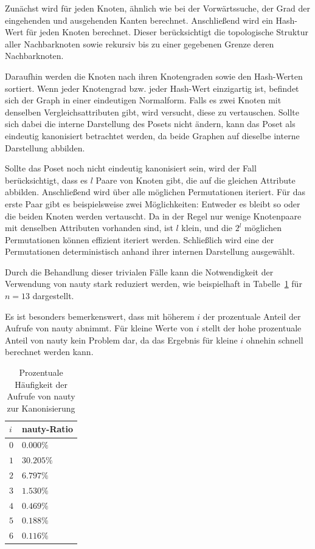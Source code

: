 \documentclass[10pt,journal,compsoc]{IEEEtran}
\begin{document}
Zunächst wird für jeden Knoten, ähnlich wie bei der Vorwärtssuche, der Grad der eingehenden und ausgehenden Kanten berechnet.
Anschließend wird ein Hash-Wert für jeden Knoten berechnet.
Dieser berücksichtigt die topologische Struktur aller Nachbarknoten sowie rekursiv bis zu einer gegebenen Grenze deren Nachbarknoten.

Daraufhin werden die Knoten nach ihren Knotengraden sowie den Hash-Werten sortiert.
Wenn jeder Knotengrad bzw. jeder Hash-Wert einzigartig ist, befindet sich der Graph in einer eindeutigen Normalform.
Falls es zwei Knoten mit denselben Vergleichsattributen gibt, wird versucht, diese zu vertauschen.
Sollte sich dabei die interne Darstellung des Posets nicht ändern, kann das Poset als eindeutig kanonisiert betrachtet werden, da beide Graphen auf dieselbe interne Darstellung abbilden.

Sollte das Poset noch nicht eindeutig kanonisiert sein, wird der Fall berücksichtigt, dass es $l$ Paare von Knoten gibt, die auf die gleichen Attribute abbilden.
Anschließend wird über alle möglichen Permutationen iteriert.
Für das erste Paar gibt es beispielsweise zwei Möglichkeiten: Entweder es bleibt so oder die beiden Knoten werden vertauscht.
Da in der Regel nur wenige Knotenpaare mit denselben Attributen vorhanden sind, ist $l$ klein, und die $2^l$ möglichen Permutationen können effizient iteriert werden. Schließlich wird eine der Permutationen deterministisch anhand ihrer internen Darstellung ausgewählt.

Durch die Behandlung dieser trivialen Fälle kann die Notwendigkeit der Verwendung von nauty stark reduziert werden, wie beispielhaft in Tabelle~\ref{table:nauty-ratio} für $n = 13$ dargestellt.

Es ist besonders bemerkenswert, dass mit höherem $i$ der prozentuale Anteil der Aufrufe von nauty abnimmt.
Für kleine Werte von $i$ stellt der hohe prozentuale Anteil von nauty kein Problem dar, da das Ergebnis für kleine $i$ ohnehin schnell berechnet werden kann.

\begin{table}
  \begin{tabular}{l|l}
    $i$ & nauty-Ratio \\
    \hline
    $0$ & $0.000\%$   \\
    $1$ & $30.205\%$  \\
    $2$ & $6.797\%$   \\
    $3$ & $1.530\%$   \\
    $4$ & $0.469\%$   \\
    $5$ & $0.188\%$   \\
    $6$ & $0.116\%$
  \end{tabular}
  \centering
  \caption{Prozentuale Häufigkeit der Aufrufe von nauty zur Kanonisierung}
  \label{table:nauty-ratio}
\end{table}
\end{document}
